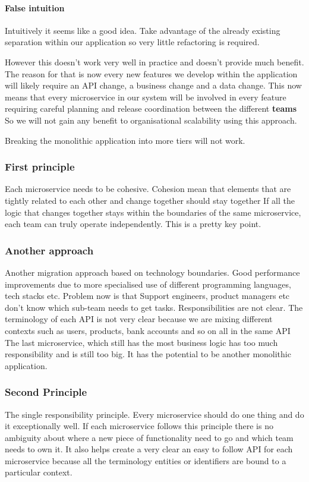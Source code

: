 \documentclass[a4paper, 11pt]{book}
\begin{document}
    \paragraph{False intuition}
    Intuitively it seems like a good idea.
    Take advantage of the already existing separation within our application so very little refactoring is required.

    However this doesn't work very well in practice and doesn't provide much benefit.
    The reason for that is now every new features we develop within the application will likely require an API change, a business change and a data change.
    This now means that every microservice in our system will be involved in every feature requiring careful planning and release coordination between the different \textbf{teams}
    So we will not gain any benefit to organisational scalability using this approach.

    Breaking the monolithic application into more tiers will not work.

    \subsubsection{First principle}
    Each microservice needs to be cohesive.
    Cohesion mean that elements that are tightly related to each other and change together should stay together
    If all the logic that changes together stays within the boundaries of the same microservice, each team can truly operate independently. This is a pretty key point.

    \subsubsection{Another approach}
    Another migration approach based on technology boundaries.
    Good performance improvements due to more specialised use of different programming languages, tech stacks etc.
    Problem now is that Support engineers, product managers etc don't know which sub-team needs to get tasks.
    Responsibilities are not clear.
    The terminology of each API is not very clear because we are mixing different contexts such as users, products, bank accounts and so on all in the same API
    The last microservice, which still has the most business logic has too much responsibility and is still too big.
    It has the potential to be another monolithic application.

    \subsubsection{Second Principle}
    The single responsibility principle.
    Every microservice should do one thing and do it exceptionally well.
    If each microservice follows this principle there is no ambiguity about where a new piece of functionality need to go and which team needs to own it.
    It also helps create a very clear an easy to follow API for each microservice because all the terminology entities or identifiers are bound to a particular context.
\end{document}
